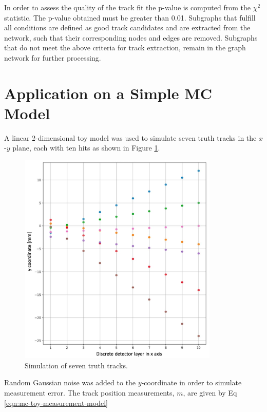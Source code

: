 In order to assess the quality of the track fit the p-value is computed from the $\chi^2$ statistic. The p-value obtained must be greater than 0.01. Subgraphs that fulfill all conditions are defined as good track candidates and are extracted from the network, such that their corresponding nodes and edges are removed. Subgraphs that do not meet the above criteria for track extraction, remain in the graph network for further processing.





\section{Application on a Simple MC Model}
\label{gnn-application-toy-model}

A linear 2-dimensional toy model was used to simulate seven truth tracks in the $x$-$y$ plane, each with ten hits as shown in Figure \ref{fig:ground-truth}. 

\begin{figure}[htbp]
    \centering
    \includegraphics[width=0.85\textwidth]{images/5-gnn-algorithm/ground-truth.png}
    \caption{Simulation of seven truth tracks.}
    \label{fig:ground-truth}%
\end{figure}

Random Gaussian noise was added to the $y$-coordinate in order to simulate measurement error. The track position measurements, $m$, are given by Eq \eqref{eqn:mc-toy-measurement-model}

